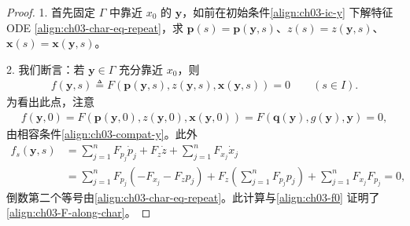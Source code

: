 \documentclass[../../main.tex]{subfiles}
\begin{document}
\begin{proof}
1. 首先固定 $\Gamma$ 中靠近 $x_0$ 的 $\mathbf{y}$，如前在初始条件\eqref{align:ch03-ic-y} 下解特征 ODE \eqref{align:ch03-char-eq-repeat}，求 $\mathbf{p}(s)=\mathbf{p}(\mathbf{y},s)$、$z(s)=z(\mathbf{y},s)$、$\mathbf{x}(s)=\mathbf{x}(\mathbf{y},s)$。

2. 我们断言：若 $\mathbf{y}\in\Gamma$ 充分靠近 $x_0$，则
\begin{align}\label{align:ch03-F-along-char}
f(\mathbf{y},s)\triangleq F(\mathbf{p}(\mathbf{y},s),z(\mathbf{y},s),\mathbf{x}(\mathbf{y},s))=0 \qquad (s\in I).
\end{align}
为看出此点，注意
\begin{align}\label{align:ch03-f0}
f(\mathbf{y},0)=F(\mathbf{p}(\mathbf{y},0),z(\mathbf{y},0),\mathbf{x}(\mathbf{y},0))=F(\mathbf{q}(\mathbf{y}),g(\mathbf{y}),\mathbf{y})=0,
\end{align}
由相容条件\eqref{align:ch03-compat-y}。此外
\begin{align*}
f_s(\mathbf{y},s)&=\sum_{j=1}^n F_{p_j}\dot{p}_j+F_z\dot{z}+\sum_{j=1}^n F_{x_j}\dot{x}_j\\
&=\sum_{j=1}^n F_{p_j}(-F_{x_j}-F_z p_j)+F_z\left(\sum_{j=1}^n F_{p_j}p_j\right)+\sum_{j=1}^n F_{x_j}F_{p_j}=0,
\end{align*}
倒数第二个等号由\eqref{align:ch03-char-eq-repeat}。此计算与\eqref{align:ch03-f0} 证明了\eqref{align:ch03-F-along-char}。


\end{proof}
\end{document}
